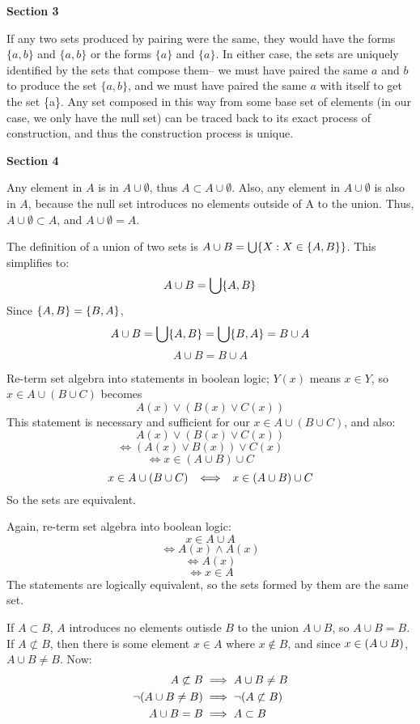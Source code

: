 \documentclass{article}
\DeclarePairedDelimiter\prn{(}{)}
\DeclarePairedDelimiter\crl{\{}{\}}
\newcommand{\nl}[0]{\newline}
\newcommand{\cimp}[1][5]{\kern#1px \iff \kern#1px}
\begin{document}
\begin{flushleft}

\centerline{\textbf{Section 3}} 
\nl
If any two sets produced by pairing were the same, they would have the forms $\{a,b\}$ and $\{a,b\}$ or the forms $\{a\}$ and $\{a\}$. In either case, the sets are uniquely identified by the sets that compose them-- we must have paired the same $a$ and $b$ to produce the set $\{a,b\}$, and we must have paired the same $a$ with itself to get the set \{a\}. Any set composed in this way from some base set of elements (in our case, we only have the null set) can be traced back to its exact process of construction, and thus the construction process is unique. \nl

\centerline{\textbf{Section 4}}
 \nl
Any element in $A$ is in $A \cup \emptyset$, thus $A \subset A \cup \emptyset$. Also, any element in $A \cup \emptyset$ is also in $A$, because the null set introduces no elements outside of A to the union. Thus, $A \cup \emptyset \subset A$, and $A \cup \emptyset = A$. \nl

 \nl
The definition of a union of two sets is $A \cup B = \bigcup\crl{X: X \in \crl{A, B}}$. This simplifies to:\nl
$$A \cup B = \bigcup\crl{A,B}$$
Since $\crl{A,B} = \crl{B,A}$,
$$A \cup B = \bigcup\crl{A, B} = \bigcup\crl{B,A} = B \cup A$$
$$A \cup B = B \cup A$$

 \nl
Re-term set algebra into statements in boolean logic; $Y(x)$ means $x \in Y$, so $x \in A \cup (B \cup C)$ becomes
$$A(x) \vee (B(x) \vee C(x))$$
This statement is necessary and sufficient for our $x \in A \cup (B \cup C)$, and also:
$$A(x) \vee (B(x) \vee C(x))$$
$$\Leftrightarrow (A(x) \vee B(x)) \vee C(x) \phantom{2cm}$$
$$\Leftrightarrow x \in (A \cup B) \cup C \phantom{2cm}$$
$$x \in A \cup (B \cup C) \cimp x \in (A \cup B) \cup C$$
So the sets are equivalent.\nl


 \nl
Again, re-term set algebra into boolean logic:
$$x \in A \cup A$$
$$\Leftrightarrow A(x) \wedge A(x)$$
$$\Leftrightarrow A(x)$$
$$\Leftrightarrow x \in A$$
The statements are logically equivalent, so the sets formed by them are the same set. \nl

 \nl
If $A \subset B$, $A$ introduces no elements outisde $B$ to the union $A \cup B$, so $A \cup B = B$. \nl
If $A \not\subset B$, then there is some element $x \in A$ where $x \not\in B$, and since $x \in \prn*{A \cup B}$, $A \cup B \neq B$. Now:
$$\begin{aligned}
A \not\subset B &\implies A \cup B \neq B \\ 
\neg\prn*{A \cup B \neq B}  &\implies \neg\prn*{A \not\subset B} \\
A \cup B = B &\implies A \subset B \\
\end{aligned}$$


\end{flushleft}
\end{document}
